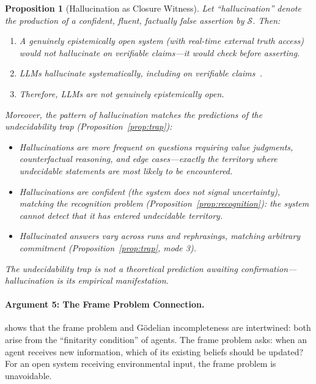 \documentclass[11pt]{article}
\newtheorem{proposition}{Proposition}
\begin{document}
\begin{proposition}[Hallucination as Closure Witness]
\label{prop:hallucination-witness}
Let ``hallucination'' denote the production of a confident, fluent, factually
false assertion by $\mathcal{S}$. Then:
\begin{enumerate}
\item A genuinely epistemically open system (with real-time external truth
      access) would not hallucinate on verifiable claims---it would check
      before asserting.
\item LLMs hallucinate systematically, including on verifiable
      claims~\citep{lin2021truthfulqa}.
\item Therefore, LLMs are not genuinely epistemically open.
\end{enumerate}
Moreover, the \textit{pattern} of hallucination matches the predictions of
the undecidability trap (Proposition~\ref{prop:trap}):
\begin{itemize}
\item Hallucinations are more frequent on questions requiring value
      judgments, counterfactual reasoning, and edge cases---exactly the
      territory where undecidable statements are most likely to be
      encountered.
\item Hallucinations are confident (the system does not signal uncertainty),
      matching the recognition problem (Proposition~\ref{prop:recognition}):
      the system cannot detect that it has entered undecidable territory.
\item Hallucinated answers vary across runs and rephrasings, matching
      arbitrary commitment (Proposition~\ref{prop:trap}, mode 3).
\end{itemize}
The undecidability trap is not a theoretical prediction awaiting
confirmation---hallucination \textit{is} its empirical manifestation.
\end{proposition}

\paragraph{Argument 5: The Frame Problem Connection.}

\citet{maruyama2017frame} shows that the frame problem and G\"{o}delian
incompleteness are intertwined: both arise from the ``finitarity condition''
of agents. The frame problem asks: when an agent receives new information,
which of its existing beliefs should be updated? For an open system receiving
environmental input, the frame problem is unavoidable.
\end{document}
